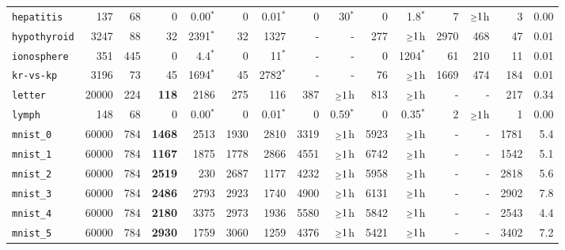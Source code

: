 \begin{tabular}{lccrrrrrrrrrrrr}
\texttt{hepatitis} & \multicolumn{1}{r}{137} & \multicolumn{1}{r}{68}  & 0 & 0.00$^*$ & 0 & 0.01$^*$ & 0 & 30$^*$ & 0 & 1.8$^*$ & 7 & $\mathsmaller{\geq}1$h & 3 & 0.00\\
\texttt{hypothyroid} & \multicolumn{1}{r}{3247} & \multicolumn{1}{r}{88}  & 32 & 2391$^*$ & 32 & 1327 & - & - & 277 & $\mathsmaller{\geq}1$h & 2970 & 468 & 47 & 0.01\\
\texttt{ionosphere} & \multicolumn{1}{r}{351} & \multicolumn{1}{r}{445}  & 0 & 4.4$^*$ & 0 & 11$^*$ & - & - & 0 & 1204$^*$ & 61 & 210 & 11 & 0.01\\
\texttt{kr-vs-kp} & \multicolumn{1}{r}{3196} & \multicolumn{1}{r}{73}  & 45 & 1694$^*$ & 45 & 2782$^*$ & - & - & 76 & $\mathsmaller{\geq}1$h & 1669 & 474 & 184 & 0.01\\
\texttt{letter} & \multicolumn{1}{r}{20000} & \multicolumn{1}{r}{224}  & \textbf{118} & 2186 & 275 & 116 & 387 & $\mathsmaller{\geq}1$h & 813 & $\mathsmaller{\geq}1$h & - & - & 217 & 0.34\\
\texttt{lymph} & \multicolumn{1}{r}{148} & \multicolumn{1}{r}{68}  & 0 & 0.00$^*$ & 0 & 0.01$^*$ & 0 & 0.59$^*$ & 0 & 0.35$^*$ & 2 & $\mathsmaller{\geq}1$h & 1 & 0.00\\
\texttt{mnist\_0} & \multicolumn{1}{r}{60000} & \multicolumn{1}{r}{784}  & \textbf{1468} & 2513 & 1930 & 2810 & 3319 & $\mathsmaller{\geq}1$h & 5923 & $\mathsmaller{\geq}1$h & - & - & 1781 & 5.4\\
\texttt{mnist\_1} & \multicolumn{1}{r}{60000} & \multicolumn{1}{r}{784}  & \textbf{1167} & 1875 & 1778 & 2866 & 4551 & $\mathsmaller{\geq}1$h & 6742 & $\mathsmaller{\geq}1$h & - & - & 1542 & 5.1\\
\texttt{mnist\_2} & \multicolumn{1}{r}{60000} & \multicolumn{1}{r}{784}  & \textbf{2519} & 230 & 2687 & 1177 & 4232 & $\mathsmaller{\geq}1$h & 5958 & $\mathsmaller{\geq}1$h & - & - & 2818 & 5.6\\
\texttt{mnist\_3} & \multicolumn{1}{r}{60000} & \multicolumn{1}{r}{784}  & \textbf{2486} & 2793 & 2923 & 1740 & 4900 & $\mathsmaller{\geq}1$h & 6131 & $\mathsmaller{\geq}1$h & - & - & 2902 & 7.8\\
\texttt{mnist\_4} & \multicolumn{1}{r}{60000} & \multicolumn{1}{r}{784}  & \textbf{2180} & 3375 & 2973 & 1936 & 5580 & $\mathsmaller{\geq}1$h & 5842 & $\mathsmaller{\geq}1$h & - & - & 2543 & 4.4\\
\texttt{mnist\_5} & \multicolumn{1}{r}{60000} & \multicolumn{1}{r}{784}  & \textbf{2930} & 1759 & 3060 & 1259 & 4376 & $\mathsmaller{\geq}1$h & 5421 & $\mathsmaller{\geq}1$h & - & - & 3402 & 7.2\\

\end{tabular}
